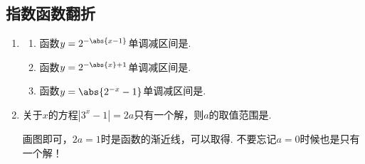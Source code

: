     \subsection*{指数函数翻折}
    \begin{enumerate}   
        \item \begin{enumerate}
            \item 函数$y=2^{-\abs{x-1}}$单调减区间是\blkda{$[1,+\infty)$}.
            \item 函数$y=2^{-\abs{x}+1}$单调减区间是\blkda{$[0,+\infty)$}. 
            
            \item 函数$y=\abs{2^{-x}-1}$单调减区间是\blkda{$(-\infty, 0]$}. 
        \end{enumerate}
    
        
        \item 关于$x$的方程$|3^x-1| = 2a$只有一个解，则$a$的取值范围是\blkda[3]{$\left[\dfrac{1}{2}, +\infty\right) \cup \{0\}$}.
        \begin{jieda}
            画图即可，$2a = 1$时是函数的渐近线，可以取得. 不要忘记$a = 0$时候也是只有一个解！
        \end{jieda}
    \end{enumerate}
